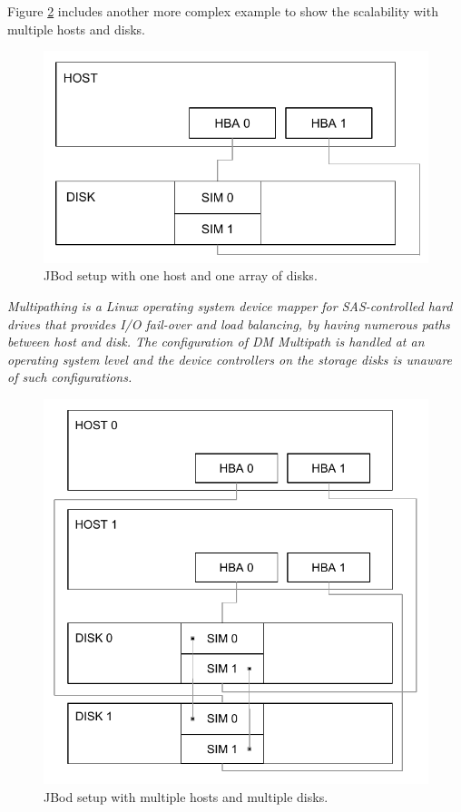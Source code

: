 Figure \ref{fig:2host-2disk} includes another more complex example to show the scalability with multiple hosts and disks.

\begin{figure}[h!]
	\centering
	\includegraphics[scale=1]{pdf/1host-1disk.pdf}
	\caption[Simple JBod setup]{JBod setup with one host and one array of disks.\label{fig:1host-1disk}}
\end{figure}

\begin{definition}[DM Multipath] \label{def:multipath}
\textit{Multipathing is a Linux operating system device mapper for SAS-controlled hard drives that provides I/O fail-over and load balancing, by having numerous paths between host and disk. The configuration of DM Multipath is handled at an operating system level and the device controllers on the storage disks is unaware of such configurations.}
\end{definition}

\begin{figure}[h!]
	\centering
	\includegraphics[scale=1]{pdf/2host-2disk.pdf}
	\caption[Complex JBod setup]{JBod setup with multiple hosts and multiple disks. \label{fig:2host-2disk}}
\end{figure}

